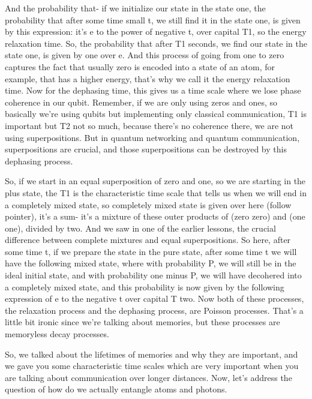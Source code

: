 And the probability that- if we initialize our state in the state one, the probability that after some time small t, we still find it in the state one, is given by this expression: it's e to the power of negative t, over capital T1, so the energy relaxation time. So, the probability that after T1 seconds, we find our state in the state one, is given by one over e. And this process of going from one to zero captures the fact that usually zero is encoded into a state of an atom, for example, that has a higher energy, that's why we call it the energy relaxation time. Now for the dephasing time, this gives us a time scale where we lose phase coherence in our qubit. Remember, if we are only using zeros and ones, so basically we're using qubits but implementing only classical communication, T1 is important but T2 not so much, because there's no coherence there, we are not using superpositions. But in quantum networking and quantum communication, superpositions are crucial, and those superpositions can be destroyed by this dephasing process.

So, if we start in an equal superposition of zero and one, so we are starting in the plus state, the T1 is the characteristic time scale that tells us when we will end in a completely mixed state, so completely mixed state is given over here (follow pointer), it's a sum- it's a mixture of these outer products of (zero zero) and (one one), divided by two. And we saw in one of the earlier lessons, the crucial difference between complete mixtures and equal superpositions. So here, after some time t, if we prepare the state in the pure state, after some time t we will have the following mixed state, where with probability P, we will still be in the ideal initial state, and with probability one minus P, we will have decohered into a completely mixed state, and this probability is now given by the following expression of e to the negative t over capital T two. Now both of these processes, the relaxation process and the dephasing process, are Poisson processes. That's a little bit ironic since we're talking about memories, but these processes are memoryless decay processes.

So, we talked about the lifetimes of memories and why they are important, and we gave you some characteristic time scales which are very important when you are talking about communication over longer distances. Now, let's address the question of how do we actually entangle atoms and photons.


